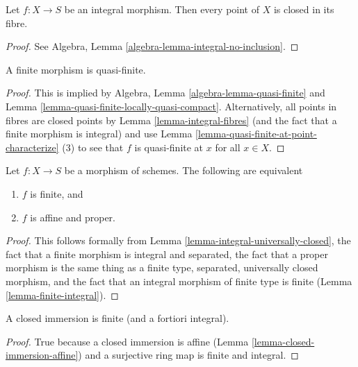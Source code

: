 \begin{lemma}
\label{lemma-integral-fibres}
Let $f : X \to S$ be an integral morphism.
Then every point of $X$ is closed in its fibre.
\end{lemma}

\begin{proof}
See Algebra, Lemma \ref{algebra-lemma-integral-no-inclusion}.
\end{proof}

\begin{lemma}
\label{lemma-finite-quasi-finite}
A finite morphism is quasi-finite.
\end{lemma}

\begin{proof}
This is implied by Algebra, Lemma \ref{algebra-lemma-quasi-finite}
and Lemma \ref{lemma-quasi-finite-locally-quasi-compact}.
Alternatively, all points in fibres are closed points by
Lemma \ref{lemma-integral-fibres} (and the fact that a finite
morphism is integral) and use
Lemma \ref{lemma-quasi-finite-at-point-characterize} (3) to
see that $f$ is quasi-finite at $x$ for all $x \in X$.
\end{proof}

\begin{lemma}
\label{lemma-finite-proper}
Let $f : X \to S$ be a morphism of schemes. The following are equivalent
\begin{enumerate}
\item $f$ is finite, and
\item $f$ is affine and proper.
\end{enumerate}
\end{lemma}

\begin{proof}
This follows formally from
Lemma \ref{lemma-integral-universally-closed},
the fact that a finite morphism is integral and separated,
the fact that a proper morphism is the same thing as
a finite type, separated, universally closed morphism,
and the fact that an integral morphism of finite type is
finite (Lemma \ref{lemma-finite-integral}).
\end{proof}

\begin{lemma}
\label{lemma-closed-immersion-finite}
A closed immersion is finite (and a fortiori integral).
\end{lemma}

\begin{proof}
True because a closed immersion is affine
(Lemma \ref{lemma-closed-immersion-affine})
and a surjective ring map is finite and integral.
\end{proof}

